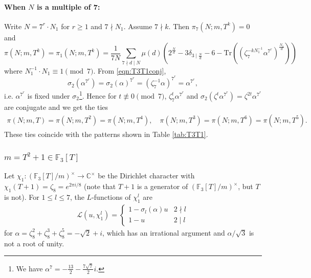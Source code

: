 \documentclass[10pt,reqno]{amsproc}
\newcommand{\Tr}{\mathrm{Tr}}
\newcommand{\bC}{\mathbb{C}}
\newcommand{\bF}{\mathbb{F}}
\newcommand{\cL}{\mathcal{L}}
\newcommand{\1}{\mathds{1}}	%
\theoremstyle{definition}
\theoremstyle{remark}
\begin{document}
\paragraph{\textbf{When $N$ is a multiple of 7:}}

Write $N = 7^r \cdot N_1$ for $r \ge 1$ and $7 \nmid N_1$.
Assume $7 \nmid k$.
Then $\pi_7(N; m, T^k) = 0$ and
\[
\pi(N; m, T^k) = \pi_1(N; m, T^k) = \frac{1}{7N} \sum_{7 \nmid d \mid N} \mu(d) \left(2^{\frac{N}{d}} - 3 \delta_{3 \mid \frac{N}{d}} - 6 - \Tr((\zeta_7^{-k N_1^{-1}} \alpha^{7^r})^{\frac{N_1}{d}})\right)
\]
where $N_1^{-1} \cdot N_1 \equiv 1 \pmod{7}$. From \eqref{eqn:T3T1conj},
\[
\sigma_2(\alpha^{7^r}) = \sigma_2(\alpha)^{7^r} = (\zeta_7^{-1} \alpha)^{7^r} = \alpha^{7^r},
\]
i.e. $\alpha^{7^r}$ is fixed under $\sigma_2$\footnote{We have $\alpha^7 = -\frac{13}{2} - \frac{7\sqrt{7}}{2}i$.}.
Hence for $t \not\equiv 0 \pmod{7}$, $\zeta_7^t \alpha^{7^r}$ and $\sigma_2(\zeta^{t} \alpha^{7^r}) = \zeta^{2t} \alpha^{7^r}$ are conjugate and we get the ties
\begin{align*}
    \pi(N; m, T) = \pi(N; m, T^2) = \pi(N; m, T^4), \quad \pi(N; m, T^3) = \pi(N; m, T^6) = \pi(N; m, T^5).
\end{align*}
These ties coincide with the patterns shown in Table \ref{tab:T3T1}.




\subsubsection{\texorpdfstring{\(m = T^2 + 1 \in \bF_3[T]\)}{m = T^2 + 1 over characteristic 3}}
\label{subsubsec:p3T21explicit}

Let $\chi_1 : (\bF_3[T] / m)^\times \to \bC^\times$ be the Dirichlet character with $\chi_1(T + 1) = \zeta_8 = e^{2\pi i / 8}$ (note that $T + 1$ is a generator of $(\bF_3[T] / m)^\times$, but $T$ is not).
For $1 \le l \le 7$, the $L$-functions of $\chi_1^l$ are
\begin{align*}
    \cL(u, \chi_1^l) = \begin{cases}
        1 - \sigma_l(\alpha)u & 2 \nmid l \\
        1 - u & 2 \mid l
    \end{cases}
\end{align*}
for $\alpha = \zeta_8^2 + \zeta_8^3 + \zeta_8^5 = -\sqrt{2} + i$, which has an irrational argument and $\alpha / \sqrt{3}$ is not a root of unity.
\end{document}
